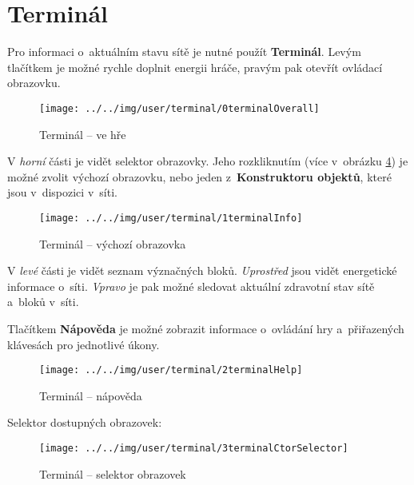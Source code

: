 
\section{Terminál}

Pro informaci o~aktuálním stavu sítě je nutné použít \textbf{Terminál}. Levým tlačítkem je možné rychle doplnit energii hráče, pravým pak otevřít ovládací obrazovku.

\begin{figure}[!ht]\centering
\texttt{[image: ../../img/user/terminal/0terminalOverall]}

\caption{Terminál -- ve hře}
\label{fig:user_terminal_0terminalOverall}

\end{figure}

\FloatBarrier

V \textit{horní} části je vidět selektor obrazovky. Jeho rozkliknutím (více v~obrázku \ref{fig:user_terminal_3terminalCtorSelector}) je možné zvolit výchozí obrazovku, nebo jeden z~\textbf{Konstruktoru objektů}, které jsou v~dispozici v~síti.




\begin{figure}[!ht]\centering
\texttt{[image: ../../img/user/terminal/1terminalInfo]}

\caption{Terminál -- výchozí obrazovka}
\label{fig:user_terminal_1terminalInfo}

\end{figure}

\FloatBarrier
V \textit{levé} části je vidět seznam význačných bloků. \textit{Uprostřed} jsou vidět energetické informace o~síti. \textit{Vpravo} je pak možné sledovat aktuální zdravotní stav sítě a~bloků v~síti.

Tlačítkem \textbf{Nápověda} je možné zobrazit informace o~ovládání hry a~přiřazených klávesách pro jednotlivé úkony.

\begin{figure}[!ht]\centering
\texttt{[image: ../../img/user/terminal/2terminalHelp]}

\caption{Terminál -- nápověda}
\label{fig:user_terminal_2terminalHelp}

\end{figure}

\FloatBarrier

Selektor dostupných obrazovek:

\begin{figure}[!ht]\centering
\texttt{[image: ../../img/user/terminal/3terminalCtorSelector]}

\caption{Terminál -- selektor obrazovek}
\label{fig:user_terminal_3terminalCtorSelector}

\end{figure}


